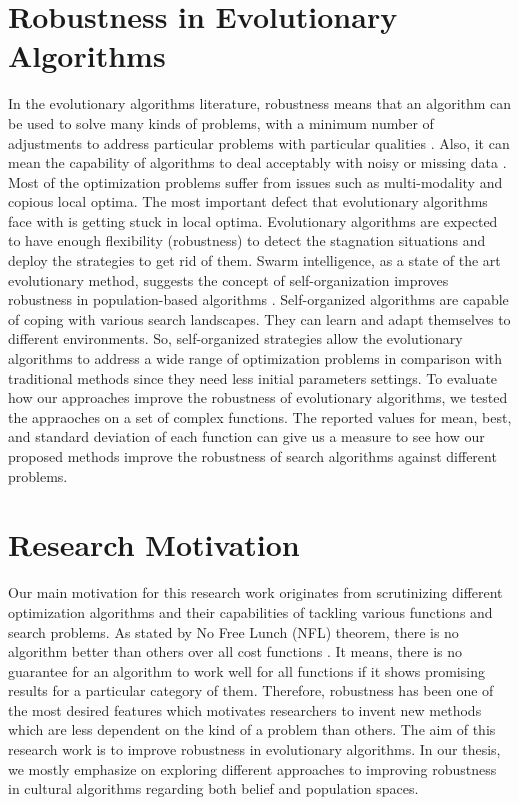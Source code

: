\section{Robustness in Evolutionary Algorithms}
In the evolutionary algorithms literature, robustness means that an algorithm can be used to solve many kinds of problems, with a minimum number of adjustments to address particular problems with particular qualities \citet{che2010robust}. Also, it can mean the capability of algorithms to deal acceptably with noisy or missing data \citet{kennedy2001swarm}. Most of the optimization problems suffer from issues such as multi-modality and copious local optima. The most important defect that evolutionary algorithms face with is getting stuck in local optima. Evolutionary algorithms are expected to have enough flexibility (robustness) to detect the stagnation situations and deploy the strategies to get rid of them.\newline
Swarm intelligence, as a state of the art evolutionary method, suggests the concept of self-organization improves robustness in population-based algorithms \citet{blum2015swarm}. Self-organized algorithms are capable of coping with various search landscapes. They can learn and adapt themselves to different environments. So, self-organized strategies allow the evolutionary algorithms to address a wide range of optimization problems in comparison with traditional methods since they need less initial parameters settings. \newline
To evaluate how our approaches improve the robustness of evolutionary algorithms, we tested the appraoches on a set of complex functions. The reported values for mean, best, and standard deviation of each function can give us a measure to see how our proposed methods improve the robustness of search algorithms against different problems.
\section{Research Motivation}
Our main motivation for this research work originates from scrutinizing different optimization algorithms and their capabilities of tackling various functions and search problems. As stated by No Free Lunch (NFL) theorem, there is no algorithm better than others over all cost functions \citet{wolpert1997no}. It means, there is no guarantee for an algorithm to work well for all functions if it shows promising results for a particular category of them. Therefore, robustness has been one of the most desired features which motivates researchers to invent new methods which are less dependent on the kind of a problem than others. The aim of this research work is to improve robustness in evolutionary algorithms. In our thesis, we mostly emphasize on exploring different approaches to improving robustness in cultural algorithms regarding both belief and population spaces.\newline
